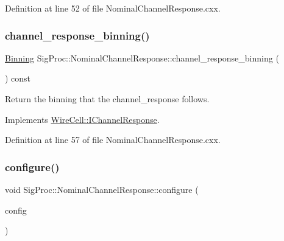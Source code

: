 Definition at line 52 of file Nominal\+Channel\+Response.\+cxx.

\mbox{\label{class_wire_cell_1_1_sig_proc_1_1_nominal_channel_response_a542dd1589356f39690c01ec012c21c48}} 
\subsubsection{\texorpdfstring{channel\+\_\+response\+\_\+binning()}{channel\_response\_binning()}}
{\footnotesize\ttfamily \hyperlink{class_wire_cell_1_1_binning}{Binning} Sig\+Proc\+::\+Nominal\+Channel\+Response\+::channel\+\_\+response\+\_\+binning (\begin{DoxyParamCaption}{ }\end{DoxyParamCaption}) const\hspace{0.3cm}{\ttfamily [virtual]}}



Return the binning that the channel\+\_\+response follows. 



Implements \hyperlink{class_wire_cell_1_1_i_channel_response_a6a3daf077f98883b5d4f9dd6529e99fe}{Wire\+Cell\+::\+I\+Channel\+Response}.



Definition at line 57 of file Nominal\+Channel\+Response.\+cxx.

\mbox{\label{class_wire_cell_1_1_sig_proc_1_1_nominal_channel_response_a3e1d2284621e69ff712cc6a7a373c797}} 
\subsubsection{\texorpdfstring{configure()}{configure()}}
{\footnotesize\ttfamily void Sig\+Proc\+::\+Nominal\+Channel\+Response\+::configure (\begin{DoxyParamCaption}\item[{const \hyperlink{namespace_wire_cell_a9f705541fc1d46c608b3d32c182333ee}{Wire\+Cell\+::\+Configuration} \&}]{config }\end{DoxyParamCaption})\hspace{0.3cm}{\ttfamily [virtual]}}



